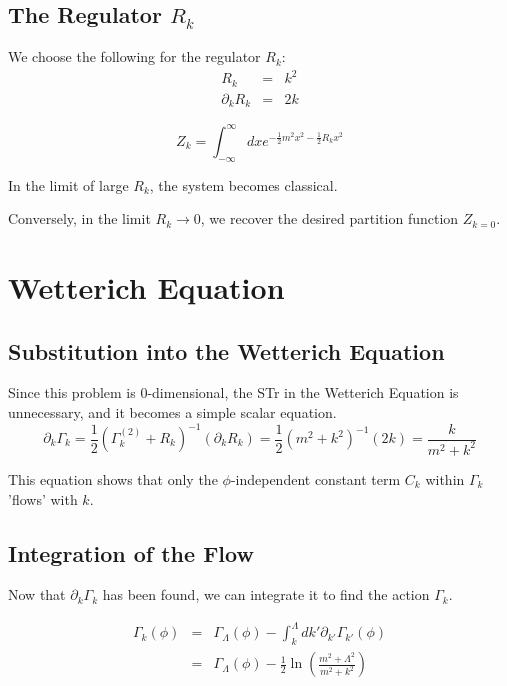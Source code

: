 \documentclass[uplatex,a4j,12pt,dvipdfmx]{jsarticle}
\begin{document}
\subsection{The Regulator $R_{k}$}

We choose the following for the regulator $R_k$:
\[
    \begin{array}{rcl}
        R_{k}           & = & k^{2} \\
        \partial_{k} R_{k} & = & 2 k
    \end{array}
\]

\[
    Z_{k} =
    \int^{\infty}_{- \infty} dx e^{ -\frac{1}{2} m^{2} x^{2} - \frac{1}{2} R_{k} x^{2} }
\]

In the limit of large $R_{k}$, the system becomes classical.

Conversely, in the limit $R_{k} \to 0$, we recover the desired partition function $Z_{k=0}$.

\section{Wetterich Equation}

\subsection{Substitution into the Wetterich Equation}

Since this problem is 0-dimensional, the STr in the Wetterich Equation is unnecessary,
and it becomes a simple scalar equation.
\[
    \partial_k \Gamma_k = \frac{1}{2} ( \Gamma_k^{(2)} + R_k )^{-1} (\partial_k R_k)
    = \frac{1}{2} ( m^2 + k^2 )^{-1} (2k)
    = \frac{k}{m^2+k^2}
\]

This equation shows that
only the $\phi$-independent constant term $C_k$ within $\Gamma_k$ 'flows' with $k$.

\subsection{Integration of the Flow}

Now that $\partial_k \Gamma_k$ has been found, we can integrate it to find the action $\Gamma_{k}$.

\[
    \begin{array}{rcl}
        \Gamma_{k}(\phi) & = & \displaystyle \Gamma_{\Lambda} (\phi) - \int^{\Lambda}_{k} dk' \partial_{k'} \Gamma_{k'}(\phi)            \\
                         & = & \displaystyle \Gamma_{\Lambda} (\phi) - \frac{1}{2} \ln \left( \frac{m^{2} + \Lambda^{2}}{m^{2}+k^{2}} \right)
    \end{array}
\]
\end{document}
